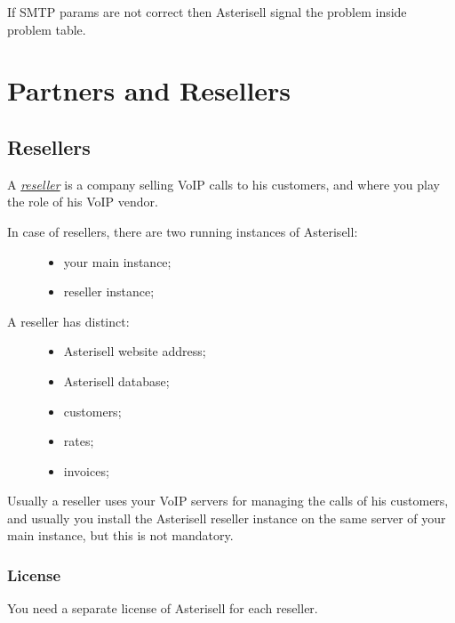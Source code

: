 \documentclass[letterpaper,10pt,english]{sphinxmanual}
\begin{document}
If SMTP params are not correct then Asterisell signal the problem inside problem table.


\chapter{Partners and Resellers}
\label{index:partners-and-resellers}

\section{Resellers}
\label{index:resellers}\label{index:id3}
A {\hyperref[index:term-reseller]{\emph{reseller}}} is a company selling VoIP calls to his customers, and where you play the role of his VoIP vendor.
\begin{description}
\item[{In case of resellers, there are two running instances of Asterisell:}] \leavevmode\begin{itemize}
\item {} 
your main instance;

\item {} 
reseller instance;

\end{itemize}

\item[{A reseller has distinct:}] \leavevmode\begin{itemize}
\item {} 
Asterisell website address;

\item {} 
Asterisell database;

\item {} 
customers;

\item {} 
rates;

\item {} 
invoices;

\end{itemize}

\end{description}

Usually a reseller uses your VoIP servers for managing the calls of his customers, and usually you install the Asterisell reseller instance on the same server of your main instance, but this is not mandatory.


\subsection{License}
\label{index:license}
You need a separate license of Asterisell for each reseller.
\end{document}
